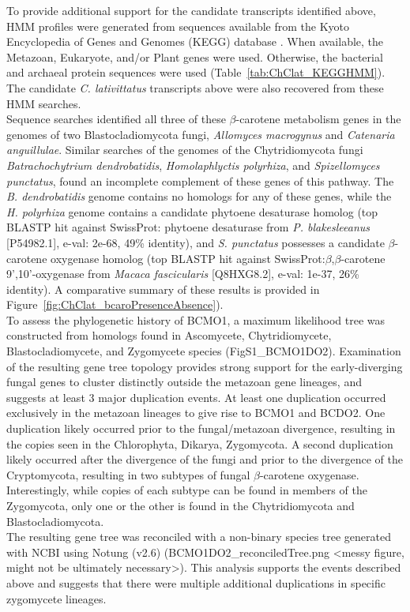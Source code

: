 \indent To provide additional support for the candidate transcripts identified above, HMM profiles were generated from sequences available from the Kyoto Encyclopedia of Genes and Genomes (KEGG) database \cite{Kanehisa2000,Kanehisa2014}. When available, the Metazoan, Eukaryote, and/or Plant genes were used. Otherwise, the bacterial and archaeal protein sequences were used (Table~\ref{tab:ChClat_KEGGHMM}). The candidate \textit{C. lativittatus} transcripts above were also recovered from these HMM searches. \\
\indent Sequence searches identified all three of these $\beta$-carotene metabolism genes in the genomes of two Blastocladiomycota fungi, \textit{Allomyces macrogynus} and \textit{Catenaria anguillulae}. Similar searches of the genomes of the Chytridiomycota fungi \textit{Batrachochytrium dendrobatidis}, \textit{Homolaphlyctis polyrhiza}, and \textit{Spizellomyces punctatus}, found an incomplete complement of these genes of this pathway. The \textit{B. dendrobatidis} genome contains no homologs for any of these genes, while the \textit{H. polyrhiza} genome contains a candidate phytoene desaturase homolog (top BLASTP hit against SwissProt: phytoene desaturase from \textit{P. blakesleeanus} [P54982.1], e-val: 2e-68, 49\% identity), and \textit{S. punctatus} possesses a candidate $\beta$-carotene oxygenase homolog (top BLASTP hit against SwissProt:$\beta$,$\beta$-carotene 9',10'-oxygenase from \textit{Macaca fascicularis} [Q8HXG8.2], e-val: 1e-37, 26\% identity). A comparative summary of these results is provided in Figure~\ref{fig:ChClat_bcaroPresenceAbsence}). \\
\indent To assess the phylogenetic history of BCMO1, a maximum likelihood tree was constructed from homologs found in Ascomycete, Chytridiomycete, Blastocladiomycete, and Zygomycete species (FigS1\_BCMO1DO2). Examination of the resulting gene tree topology provides strong support for the early-diverging fungal genes to cluster distinctly outside the metazoan gene lineages, and suggests at least 3 major duplication events. At least one duplication occurred exclusively in the metazoan lineages to give rise to BCMO1 and BCDO2. One duplication likely occurred prior to the fungal/metazoan divergence, resulting in the copies seen in the Chlorophyta, Dikarya, Zygomycota. A second duplication likely occurred after the divergence of the fungi and prior to the divergence of the Cryptomycota, resulting in two subtypes of fungal $\beta$-carotene oxygenase. Interestingly, while copies of each subtype can be found in members of the Zygomycota, only one or the other is found in the Chytridiomycota and Blastocladiomycota.\\
\indent The resulting gene tree was reconciled with a non-binary species tree generated with NCBI using Notung (v2.6) (BCMO1DO2\_reconciledTree.png <messy figure, might not be ultimately necessary>). This analysis supports the events described above and suggests that there were multiple additional duplications in specific zygomycete lineages. \\

